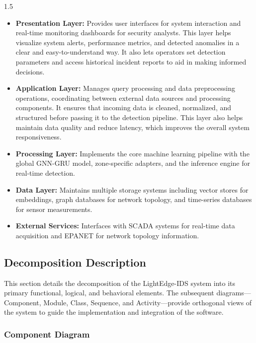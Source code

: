 \begin{spacing}{1.5}
\begin{itemize}
\item \textbf{Presentation Layer:} Provides user interfaces for system interaction and real-time monitoring dashboards for security analysts. This layer helps visualize system alerts, performance metrics, and detected anomalies in a clear and easy-to-understand way. It also lets operators set detection parameters and access historical incident reports to aid in making informed decisions.
\bigbreak
\item \textbf{Application Layer:} Manages query processing and data preprocessing operations, coordinating between external data sources and processing components. It ensures that incoming data is cleaned, normalized, and structured before passing it to the detection pipeline. This layer also helps maintain data quality and reduce latency, which improves the overall system responsiveness.
\bigbreak
\item \textbf{Processing Layer:} Implements the core machine learning pipeline with the global GNN-GRU model, zone-specific adapters, and the inference engine for real-time detection.
\bigbreak
\item \textbf{Data Layer:} Maintains multiple storage systems including vector stores for embeddings, graph databases for network topology, and time-series databases for sensor measurements.
\bigbreak
\item \textbf{External Services:} Interfaces with SCADA systems for real-time data acquisition and EPANET for network topology information.

\end{itemize}


\subsection{Decomposition Description}
This section details the decomposition of the LightEdge-IDS system into its primary functional, logical, and behavioral elements. The subsequent diagrams—Component, Module, Class, Sequence, and Activity—provide orthogonal views of the system to guide the implementation and integration of the software.

\subsubsection{Component Diagram}

\begin{figure}[H]
\centering
\begin{tikzpicture}[node distance=1.1cm, scale=0.7, every node/.style={transform shape}]


\end{tikzpicture}
\end{figure}
\end{spacing}
